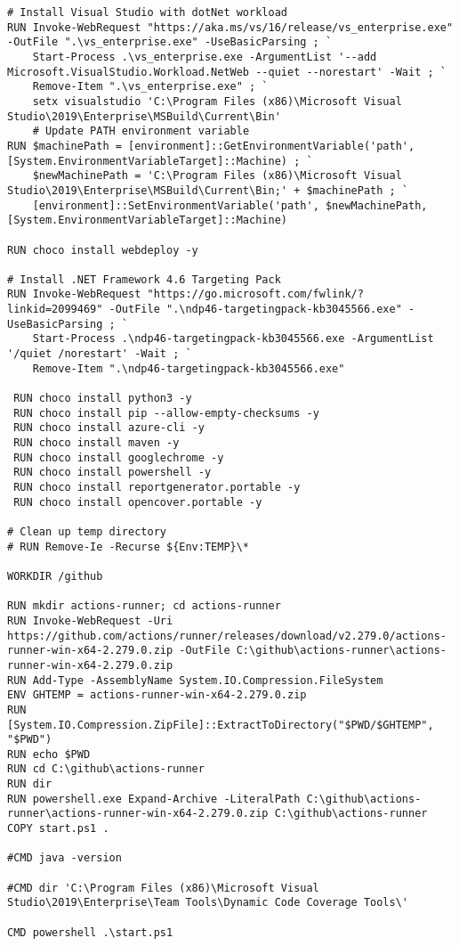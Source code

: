 \begin{lstlisting}[breaklines]
# Install Visual Studio with dotNet workload
RUN Invoke-WebRequest "https://aka.ms/vs/16/release/vs_enterprise.exe" -OutFile ".\vs_enterprise.exe" -UseBasicParsing ; `
    Start-Process .\vs_enterprise.exe -ArgumentList '--add Microsoft.VisualStudio.Workload.NetWeb --quiet --norestart' -Wait ; `
    Remove-Item ".\vs_enterprise.exe" ; `
    setx visualstudio 'C:\Program Files (x86)\Microsoft Visual Studio\2019\Enterprise\MSBuild\Current\Bin'
    # Update PATH environment variable
RUN $machinePath = [environment]::GetEnvironmentVariable('path', [System.EnvironmentVariableTarget]::Machine) ; `
    $newMachinePath = 'C:\Program Files (x86)\Microsoft Visual Studio\2019\Enterprise\MSBuild\Current\Bin;' + $machinePath ; `
    [environment]::SetEnvironmentVariable('path', $newMachinePath, [System.EnvironmentVariableTarget]::Machine)
    
RUN choco install webdeploy -y

# Install .NET Framework 4.6 Targeting Pack
RUN Invoke-WebRequest "https://go.microsoft.com/fwlink/?linkid=2099469" -OutFile ".\ndp46-targetingpack-kb3045566.exe" -UseBasicParsing ; `
    Start-Process .\ndp46-targetingpack-kb3045566.exe -ArgumentList '/quiet /norestart' -Wait ; `
    Remove-Item ".\ndp46-targetingpack-kb3045566.exe"

 RUN choco install python3 -y
 RUN choco install pip --allow-empty-checksums -y
 RUN choco install azure-cli -y
 RUN choco install maven -y
 RUN choco install googlechrome -y
 RUN choco install powershell -y
 RUN choco install reportgenerator.portable -y
 RUN choco install opencover.portable -y

# Clean up temp directory
# RUN Remove-Ie -Recurse ${Env:TEMP}\*

WORKDIR /github

RUN mkdir actions-runner; cd actions-runner
RUN Invoke-WebRequest -Uri https://github.com/actions/runner/releases/download/v2.279.0/actions-runner-win-x64-2.279.0.zip -OutFile C:\github\actions-runner\actions-runner-win-x64-2.279.0.zip
RUN Add-Type -AssemblyName System.IO.Compression.FileSystem 
ENV GHTEMP = actions-runner-win-x64-2.279.0.zip
RUN [System.IO.Compression.ZipFile]::ExtractToDirectory("$PWD/$GHTEMP", "$PWD")
RUN echo $PWD
RUN cd C:\github\actions-runner
RUN dir
RUN powershell.exe Expand-Archive -LiteralPath C:\github\actions-runner\actions-runner-win-x64-2.279.0.zip C:\github\actions-runner
COPY start.ps1 .

#CMD java -version

#CMD dir 'C:\Program Files (x86)\Microsoft Visual Studio\2019\Enterprise\Team Tools\Dynamic Code Coverage Tools\'

CMD powershell .\start.ps1
\end{lstlisting}

